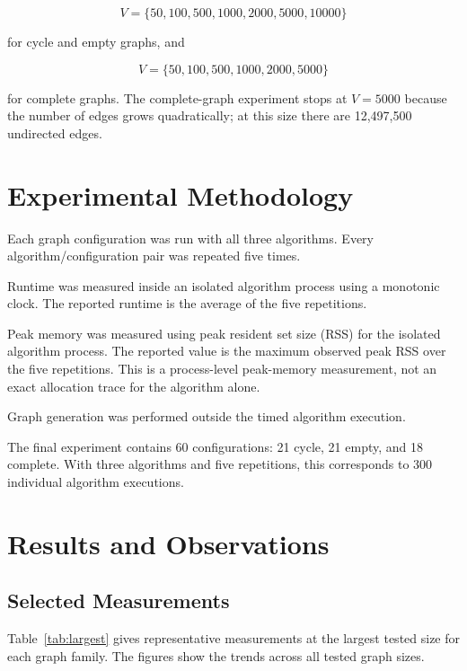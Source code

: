 \documentclass[11pt]{article}
\begin{document}
\[
V=\{50,100,500,1000,2000,5000,10000\}
\]

for cycle and empty graphs, and

\[
V=\{50,100,500,1000,2000,5000\}
\]

for complete graphs. The complete-graph experiment stops at $V=5000$
because the number of edges grows quadratically; at this size there are
12,497,500 undirected edges.

\section{Experimental Methodology}

Each graph configuration was run with all three algorithms. Every
algorithm/configuration pair was repeated five times.

Runtime was measured inside an isolated algorithm process using a monotonic
clock. The reported runtime is the average of the five repetitions.

Peak memory was measured using peak resident set size (RSS) for the isolated
algorithm process. The reported value is the maximum observed peak RSS over
the five repetitions. This is a process-level peak-memory measurement, not an
exact allocation trace for the algorithm alone.

Graph generation was performed outside the timed algorithm execution.

The final experiment contains 60 configurations: 21 cycle, 21 empty, and 18
complete. With three algorithms and five repetitions, this corresponds to
300 individual algorithm executions.

\section{Results and Observations}

\subsection{Selected Measurements}

Table~\ref{tab:largest} gives representative measurements at the largest
tested size for each graph family. The figures show the trends across all
tested graph sizes.
\end{document}
